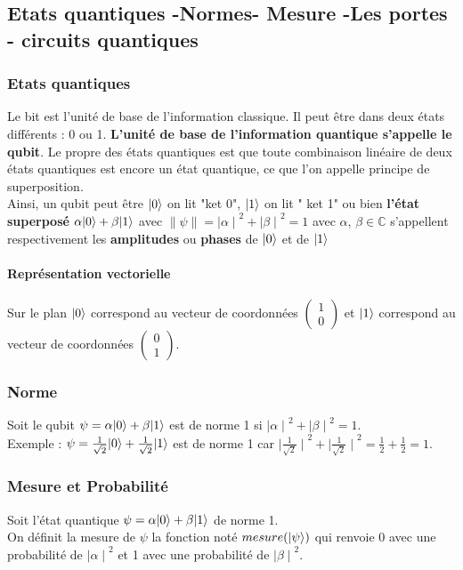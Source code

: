 \documentclass[12pt,openany]{report}
\DeclarePairedDelimiter\ket{\lvert}{\rangle}
\begin{document}
\subsection{Etats quantiques -Normes- Mesure -Les portes - circuits quantiques}

\subsubsection{Etats quantiques}
Le bit est l’unité de base de l’information classique. Il
peut être dans deux états différents : 0 ou 1. \textbf{L’unité de base de l’information
quantique s’appelle le qubit}. Le propre des états quantiques est que toute
combinaison linéaire de deux états quantiques est encore un état quantique,
ce que l’on appelle principe de superposition.\\ Ainsi, un qubit peut être $\ket{0}$ on lit "ket 0", $\ket{1} $ on lit " ket 1"  ou bien \textbf{l'état superposé } $ \alpha \ket{0} + \beta \ket{1}  $  avec $\lVert \psi\rVert = {\mid \alpha \mid}^2  + { \mid \beta \mid}^2 = 1$ avec $\alpha $, $ \beta \in \mathbb{C} $ s'appellent respectivement les \textbf{amplitudes } ou \textbf{phases} de $ \ket{0} $ et de $\ket{1} $
\paragraph{Représentation vectorielle\\} Sur le plan $ \ket{0} $ correspond au vecteur de coordonnées $ \left( \begin{matrix}
1\\
0
\end{matrix}\right)  $ et $\ket{1}$ correspond au vecteur de coordonnées $ \left( \begin{matrix}
0\\
1
\end{matrix}\right)  $.

\subsubsection{Norme} 
Soit le qubit $ \psi = \alpha \ket{0} + \beta \ket{1}  $ est de norme 1 si $ {\mid \alpha \mid}^2  + { \mid \beta \mid}^2 = 1$.\\
Exemple : $ \psi = \frac{1}{\sqrt{2}} \ket{0} +  \frac{1}{\sqrt{2}} \ket{1} $ est de norme 1 car  $ {\mid \frac{1}{\sqrt{2}} \mid}^2  + { \mid \frac{1}{\sqrt{2}} \mid}^2 = \frac{1}{2} + \frac{1}{2}=1 $.

\subsubsection{Mesure et Probabilité}
Soit l'état quantique $  \psi = \alpha \ket{0} + \beta \ket{1}  $ de norme 1.\\
On définit la mesure de $ \psi $ la fonction  noté $mesure(\ket{\psi})  $ qui renvoie 0 avec une probabilité de $ {\mid \alpha \mid}^2 $ et 1 avec une probabilité de $ {\mid \beta \mid}^2 $.\\
\end{document}
